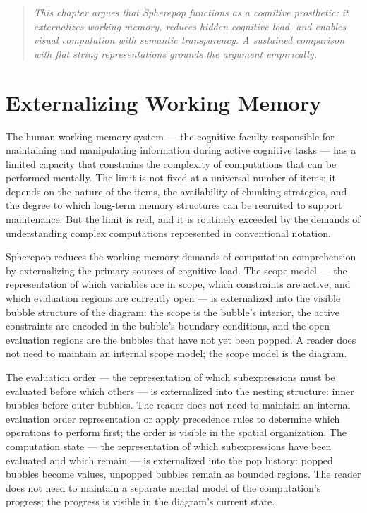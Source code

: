 \documentclass[12pt,openany]{book}
\theoremstyle{plain}
\theoremstyle{definition}
\theoremstyle{remark}
\newenvironment{chapterprecis}{%
  \begin{quote}\small\itshape}{%
  \end{quote}\medskip}
\begin{document}
\begin{chapterprecis}
This chapter argues that Spherepop functions as a cognitive
prosthetic: it externalizes working memory, reduces hidden
cognitive load, and enables visual computation with semantic
transparency. A sustained comparison with flat string
representations grounds the argument empirically.
\end{chapterprecis}

\section{Externalizing Working Memory}

The human working memory system — the cognitive faculty responsible for maintaining and manipulating information during active cognitive tasks — has a limited capacity that constrains the complexity of computations that can be performed mentally. The limit is not fixed at a universal number of items; it depends on the nature of the items, the availability of chunking strategies, and the degree to which long-term memory structures can be recruited to support maintenance. But the limit is real, and it is routinely exceeded by the demands of understanding complex computations represented in conventional notation.

Spherepop reduces the working memory demands of computation comprehension by externalizing the primary sources of cognitive load. The scope model — the representation of which variables are in scope, which constraints are active, and which evaluation regions are currently open — is externalized into the visible bubble structure of the diagram: the scope is the bubble's interior, the active constraints are encoded in the bubble's boundary conditions, and the open evaluation regions are the bubbles that have not yet been popped. A reader does not need to maintain an internal scope model; the scope model is the diagram.

The evaluation order — the representation of which subexpressions must be evaluated before which others — is externalized into the nesting structure: inner bubbles before outer bubbles. The reader does not need to maintain an internal evaluation order representation or apply precedence rules to determine which operations to perform first; the order is visible in the spatial organization. The computation state — the representation of which subexpressions have been evaluated and which remain — is externalized into the pop history: popped bubbles become values, unpopped bubbles remain as bounded regions. The reader does not need to maintain a separate mental model of the computation's progress; the progress is visible in the diagram's current state.
\end{document}
